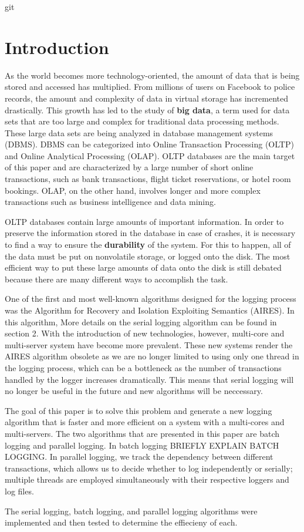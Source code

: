 git \section{Introduction}

As the world becomes more technology-oriented, the amount of data that is being stored and accessed has multiplied. From millions of users on Facebook to police records, the amount and complexity of data in virtual storage has incremented drastically. This growth has led to the study of \textbf{big data}, a term used for data sets that are too large and complex for traditional data processing methods. These large data sets are being analyzed in database management systems (DBMS). DBMS can be categorized into Online Transaction Processing (OLTP) and Online Analytical Processing (OLAP). OLTP databases are the main target of this paper and are characterized by a large number of short online transactions, such as bank transactions, flight ticket reservations, or hotel room bookings. OLAP, on the other hand, involves longer and more complex transactions such as business intelligence and data mining. \newline

OLTP databases contain large amounts of important information. In order to preserve the information stored in the database in case of crashes, it is necessary to find a way to ensure the \textbf{durability} of the system. For this to happen, all of the data must be put on nonvolatile storage, or logged onto the disk. The most efficient way to put these large amounts of data onto the disk is still debated because there are many different ways to accomplish the task. \newline

One of the first and most well-known algorithms designed for the logging process was the Algorithm for Recovery and Isolation Exploiting Semantics (AIRES). In this algorithm, 
More details on the serial logging algorithm can be found in section 2. With the introduction of new technologies, however, multi-core and multi-server system have become more prevalent. These new systems render the AIRES algorithm obsolete as we are no longer limited to using only one thread in the logging process, which can be a bottleneck as the number of transactions handled by the logger increases dramatically. This means that serial logging will no longer be useful in the future and new algorithms will be neccessary.  \newline

The goal of this paper is to solve this problem and generate a new logging algorithm that is faster and more efficient on a system with a multi-cores and multi-servers. The two algorithms that are presented in this paper are batch logging and parallel logging. In batch logging BRIEFLY EXPLAIN BATCH LOGGING. In parallel logging, we track the dependency between different transactions, which allows us to decide whether to log  independently or serially; multiple threads are employed simultaneously with their respective loggers and log files. \newline

The serial logging, batch logging, and parallel logging algorithms were implemented and then tested to determine the effiecieny of each. 


  
